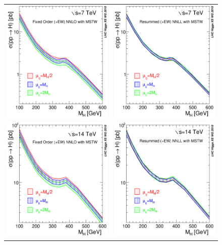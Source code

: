 \begin{itemize}
\begin{figure}[htb]
\vspace{5pt}
\begin{center}
\begin{tabular}{cc}
\includegraphics[width=.42\linewidth]{YRHXS_ggF/YRHXS_ggF_fig3} &
\includegraphics[width=.42\linewidth]{YRHXS_ggF/YRHXS_ggF_fig4} \\
\includegraphics[width=.42\linewidth]{YRHXS_ggF/YRHXS_ggF_fig5} &
\includegraphics[width=.42\linewidth]{YRHXS_ggF/YRHXS_ggF_fig6} \\

\end{tabular}
\end{center}
\end{figure}
\end{itemize}
